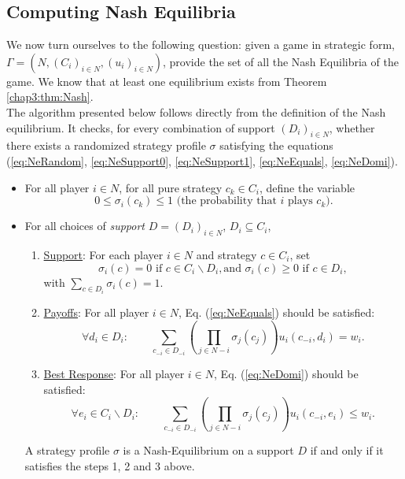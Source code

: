 \subsection{Computing Nash Equilibria}

We now turn ourselves to the following question: given a game in strategic form,
$\Gamma = (N, (C_i)_{i \in N}, (u_i)_{i \in N})$, provide the set of all the Nash Equilibria of the game.
We know that at least one equilibrium exists from Theorem \ref{chap3:thm:Nash}. \\
The algorithm presented below follows directly from the definition of the Nash equilibrium. It checks, for every combination of support $(D_i)_{i \in N}$, whether there exists a randomized strategy profile $\sigma$ satisfying the equations (\ref{eq:NeRandom}, \ref{eq:NeSupport0}, \ref{eq:NeSupport1}, \ref{eq:NeEquals},  \ref{eq:NeDomi}).


\begin{procedure}
\begin{itemize}
\item For all player $i \in N$, for all pure strategy $c_k \in C_i$, define the variable
$$ 0 \leq \sigma_i(c_k) \leq 1 \text{ (the probability that $i$ plays $c_k$)}.$$
\item For all choices of \emph{support} $D = (D_i)_{i \in N}$, $D_i \subseteq C_i$,
\begin{enumerate}
\item \underline{Support}:
 For each player $i \in N$ and strategy $c \in C_i$, set
$$ \sigma_i(c) = 0 \text{ if $c \in C_i \backslash D_i$}, \text{and } \sigma_i(c) \geq 0 \text{ if $c \in D_i$},$$
with $ \sum_{c \in D_i} \sigma_i(c) = 1$.
\label{chap3:prc2:support}
\item \underline{Payoffs}: For all player $i \in N$,  Eq. (\ref{eq:NeEquals}) should be satisfied:
$$ \forall d_i \in D_i:  \qquad  \sum_{c_{-i} \in D_{-i}} \left  ( \prod_{j \in N-i} \sigma_j(c_j) \right ) u_i(c_{-i}, d_i) = w_i.  $$
\label{chap3:prc2:equ}
\item \underline{Best Response}:  For all player $i \in N$, Eq. (\ref{eq:NeDomi}) should be satisfied:
$$ \forall e_i \in C_i \backslash D_i:  \qquad \sum_{c_{-i} \in D_{-i}} \left  ( \prod_{j \in N-i} \sigma_j(c_j) \right ) u_i(c_{-i}, e_i) \leq w_i. $$
 \label{chap3:prc2:domi}
\end{enumerate}
A strategy profile $\sigma$ is a Nash-Equilibrium on a support $D$ if and only if it satisfies the steps 1, 2 and 3 above.
\end{itemize}
\label{chap3:proc:computeNash}
\end{procedure}


